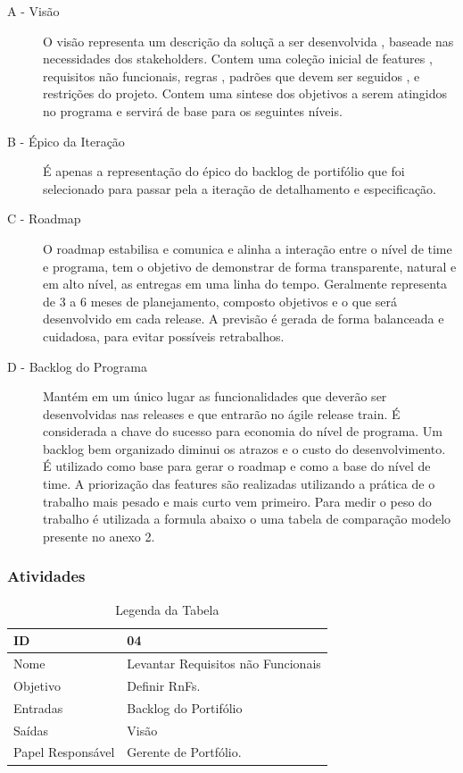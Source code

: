   \begin{description}
    \item[A - Visão]
    O visão representa um descrição da soluçã a ser desenvolvida , baseade nas necessidades
    dos stakeholders. Contem uma coleção inicial de features , requisitos não funcionais,
    regras , padrões que devem ser seguidos , e restrições do projeto. Contem uma sintese dos
    objetivos a serem atingidos no programa e servirá de base para os seguintes níveis.\cite{vision}
    \item[B - Épico da Iteração]
    É apenas a representação do épico do backlog de portifólio que foi selecionado
    para passar pela a iteração de detalhamento e especificação.
    \item[C - Roadmap]
    O roadmap estabilisa e comunica e alinha a interação entre o nível de time e programa,
    tem o objetivo de demonstrar de forma transparente, natural e em alto nível, as entregas
    em uma linha do tempo. Geralmente representa de 3 a 6 meses de planejamento, composto objetivos
    e o que será desenvolvido em cada release. A previsão é gerada de forma balanceada e cuidadosa,
    para evitar possíveis retrabalhos. \cite{roadmap}
    \item[D - Backlog do Programa]
    Mantém em um único lugar as funcionalidades que deverão ser desenvolvidas nas releases
    e que entrarão no ágile release train. É considerada a chave do sucesso para economia
    do nível de programa. Um backlog bem organizado diminui os atrazos e o custo do desenvolvimento.
    É utilizado como base para gerar o roadmap e como a base do nível de time\cite{programbacklog}.
    A priorização das features são realizadas utilizando a prática de o trabalho mais pesado e
    mais curto vem primeiro. Para medir o peso do trabalho é utilizada a formula abaixo  o
    uma tabela de comparação modelo presente no anexo 2\cite{wsjf}.

  \end{description}


  \subsubsection{Atividades}

  \begin{table}[H]
    \centering
      \begin{tabular}{| m{5em} | m{10cm} |}
        \hline
        ID       & 04   \\ \hline
        Nome     & Levantar Requisitos não Funcionais   \\ \hline
        Objetivo & Definir RnFs. \\ \hline
        Entradas & Backlog do Portifólio   \\ \hline
        Saídas   & Visão \\ \hline
        Papel Responsável   & Gerente de Portfólio. \\ \hline
      \end{tabular}
      \caption{Legenda da Tabela}
      \label{tabela:atividade4}
  \end{table}

